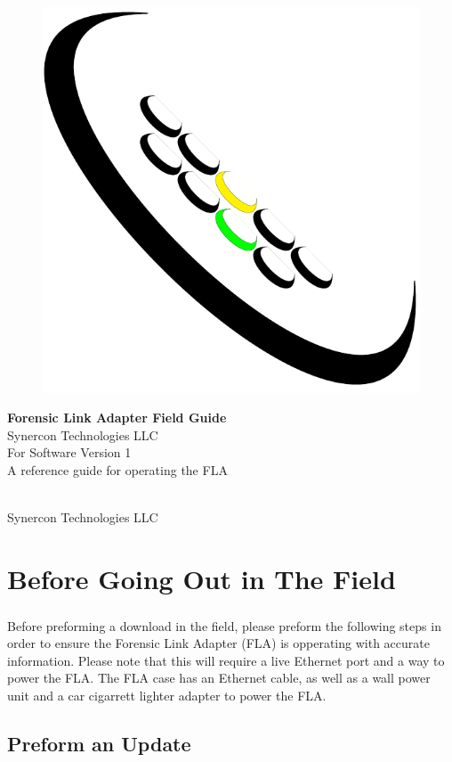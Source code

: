 \documentclass[11pt, oneside]{book}
\newcommand*{\titleGP}{\begingroup %
\centering %
\vspace*{\baselineskip} %
\begin{figure}[tbph]
\centering
\includegraphics[width=0.15\linewidth]{../media/logos/synercon_logo_v3_only}
\label{fig:logo}
\end{figure}
\vspace{4cm}
{\Huge \textbf{Forensic Link Adapter Field Guide}}\\[2\baselineskip] %
{\Huge Synercon Technologies LLC}\\[2\baselineskip]
{\Large For Software Version 1}\\
\vspace{2cm}
A reference guide for operating the FLA

\vfill %


\textcopyright {\scshape 2015} \\[0.3\baselineskip] %
Synercon Technologies LLC

\endgroup}
\begin{document}


\pagestyle{newstyle}




\thispagestyle{empty}
\titleGP %

\newpage
\frontmatter
\tableofcontents


\newpage
\mainmatter


\chapter{Before Going Out in The Field}
\paragraph{  }
Before preforming a download in the field, please preform the following steps in order to ensure the Forensic Link Adapter (FLA) is opperating with accurate information. Please note that this will require a live Ethernet port and a way to power the FLA. The FLA case has an Ethernet cable, as well as a wall power unit and a car cigarrett lighter adapter to power the FLA.
\section{Preform an Update}
\end{document}
